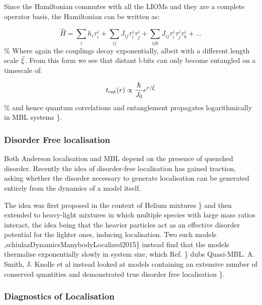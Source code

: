 Since the Hamiltonian commutes with all the LIOMs and they are a complete operator basis, the Hamiltonian can be written as:

\[\hat{H} = \sum_{i} h_i \tau^z_i + \sum_{ij} J_{ij} \tau^z_i \tau^z_j + \sum_{ijk} J_{ij} \tau^z_i \tau^z_j \tau^z_k+ ...\] \% Where again the couplings decay exponentially, albeit with a different length scale \(\Bar{\xi}\). From this form we see that distant l-bits can only become entangled on a timescale of:

\[ t_{\mathrm{ent}}(r) \propto \frac{\hbar}{J_0} e^{r/\Bar{\xi}} \] \% and hence quantum correlations and entanglement propagates logarithmically in MBL systems \textcite{imbrieDiagonalizationManyBodyLocalization2016}\}.

\hypertarget{disorder-free-localisation}{%
\subsubsection{Disorder Free localisation}\label{disorder-free-localisation}}

Both Anderson localisation and MBL depend on the presence of quenched disorder. Recently the idea of disorder-free localisation has gained traction, asking whether the disorder necessary to generate localisation can be generated entirely from the dynamics of a model itself.

The idea was first proposed in the context of Helium mixtures \textcite{kagan1984localization}\} and then extended to heavy-light mixtures in which multiple species with large mass ratios interact, the idea being that the heavier particles act as an effective disorder potential for the lighter ones, inducing localisation. Two such models \textcite{yaoQuasiManyBodyLocalizationTranslationInvariant2016},schiulazDynamicsManybodyLocalized2015\} instead find that the models thermalise exponentially slowly in system size, which Ref. \textcite{yaoQuasiManyBodyLocalizationTranslationInvariant2016}\} dubs Quasi-MBL. A. Smith, J. Knolle et al instead looked at models containing an extensive number of conserved quantities and demonstrated true disorder free localisation \textcite{smithDisorderFreeLocalization2017}\}.

\hypertarget{diagnostics-of-localisation}{%
\subsubsection{Diagnostics of Localisation}\label{diagnostics-of-localisation}}

